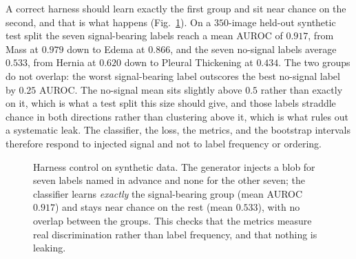 \documentclass[10pt,twocolumn]{article}
\begin{document}
A correct harness should learn exactly the first group and sit near chance on the
second, and that is what happens (Fig.~\ref{fig:synth}). On a $350$-image held-out
synthetic test split the seven signal-bearing labels reach a mean AUROC of $0.917$,
from Mass at $0.979$ down to Edema at $0.866$, and the seven no-signal labels
average $0.533$, from Hernia at $0.620$ down to Pleural Thickening at $0.434$. The
two groups do not overlap: the worst signal-bearing label outscores the best
no-signal label by $0.25$ AUROC. The no-signal mean sits slightly above $0.5$
rather than exactly on it, which is what a test split this size should give, and
those labels straddle chance in both directions rather than clustering above it,
which is what rules out a systematic leak. The classifier, the loss, the metrics,
and the bootstrap intervals therefore respond to injected signal and not to label
frequency or ordering.

\begin{figure}[tbp]
\centering
{}
\caption{Harness control on synthetic data. The generator injects a blob for seven
labels named in advance and none for the other seven; the classifier learns
\emph{exactly} the signal-bearing group (mean AUROC $0.917$) and stays near chance
on the rest (mean $0.533$), with no overlap between the groups. This checks that
the metrics measure real discrimination rather than label frequency, and that
nothing is leaking.}
\label{fig:synth}
\end{figure}
\end{document}
